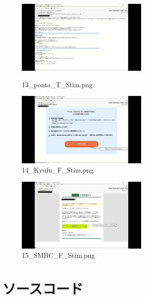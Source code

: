 \documentclass[a4paper,11pt]{ltjsreport}
\begin{document}
\begin{figure}[H]
	\centering
	\begin{minipage}{0.45\linewidth}
		\centering
		\includegraphics[width=6.5cm]{img/stimuli/13_ponta_T_Stim.png}
		\caption{13\_ponta\_T\_Stim.png}
		\label{fig:a13}
	\end{minipage}
	\begin{minipage}{0.45\linewidth}
		\centering
		\includegraphics[width=6.5cm]{img/stimuli/14_Kyufu_F_Stim.png}
		\caption{14\_Kyufu\_F\_Stim.png}
		\label{fig:a14}
	\end{minipage}
\end{figure}

\begin{figure}[H]
	\centering
	\begin{minipage}{0.45\linewidth}
		\centering
		\includegraphics[width=6.5cm]{img/stimuli/15_SMBC_F_Stim.png}
		\caption{15\_SMBC\_F\_Stim.png}
		\label{fig:a15}
	\end{minipage}
	\begin{minipage}{0.45\linewidth}
		\hspace{1em}
	\end{minipage}
\end{figure}

\chapter{ソースコード}
\end{document}

